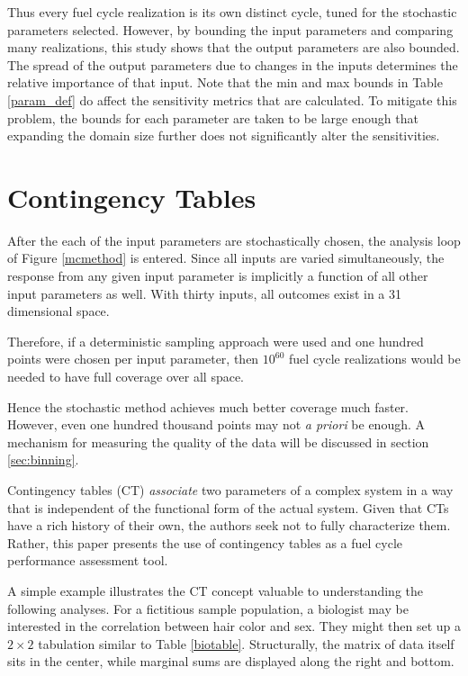 \documentclass[preprint,12pt]{elsarticle}
\begin{document}
Thus every fuel cycle realization is its own distinct cycle, tuned for the stochastic parameters selected.
However, by bounding the input parameters and comparing many realizations, this study shows that the
output parameters are also bounded.  The spread of the output parameters due to changes in the inputs
determines the relative importance of that input.  Note that the min and max bounds
in Table \ref{param_def} do affect the sensitivity metrics that are calculated.
To mitigate this problem, the bounds for each parameter are taken to be 
large enough that expanding the domain size further does not significantly 
alter the sensitivities.


%
%



\section{Contingency Tables}
\label{sec:ct}

After the each of the input parameters are stochastically chosen, the analysis 
loop of Figure \ref{mcmethod} is entered. Since all inputs are varied simultaneously, 
the response from any given input parameter is implicitly a function of all other 
input parameters as well.  With thirty inputs, all outcomes exist in a 31 dimensional 
space.

Therefore, if a deterministic sampling approach were used and one hundred points
were chosen per input parameter, then $10^{60}$ fuel cycle realizations would be 
needed to have full coverage over all space.

Hence the stochastic method achieves much better coverage much faster.  However, 
even one hundred thousand points may not \emph{a priori} be enough.  A mechanism 
for measuring the quality of the data will be discussed in section \ref{sec:binning}.

Contingency tables (CT) \cite{Everitt1992,Press2007,Yao2003} \emph{associate} two parameters of a
complex system in a way that is independent of the functional form of the actual system.
Given that CTs have a rich history of their own, the authors seek not to fully characterize them.  
Rather, this paper presents the use of contingency tables as a fuel cycle performance assessment tool.

A simple example illustrates the CT concept valuable to understanding the following analyses.  For a 
fictitious sample population, a biologist may be interested in the correlation between hair color and sex.  
They might then set up a $2\times 2$ tabulation similar to Table \ref{biotable}.  Structurally, the matrix of 
data itself sits in the center, while marginal sums are displayed along the right and bottom.
\end{document}
